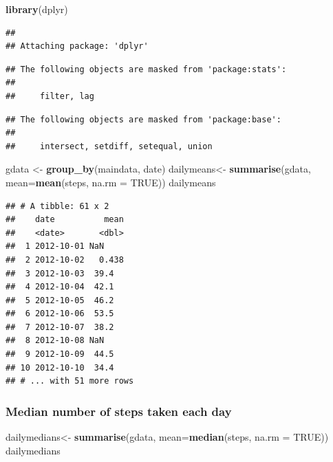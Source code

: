 \documentclass[]{article}
\newenvironment{Shaded}{\begin{snugshade}}{\end{snugshade}}
\newcommand{\KeywordTok}[1]{\textcolor[rgb]{0.13,0.29,0.53}{\textbf{#1}}}
\newcommand{\DataTypeTok}[1]{\textcolor[rgb]{0.13,0.29,0.53}{#1}}
\newcommand{\StringTok}[1]{\textcolor[rgb]{0.31,0.60,0.02}{#1}}
\newcommand{\OtherTok}[1]{\textcolor[rgb]{0.56,0.35,0.01}{#1}}
\newcommand{\NormalTok}[1]{#1}
\begin{document}
\begin{Shaded}
\begin{Highlighting}[]
\KeywordTok{library}\NormalTok{(dplyr)}
\end{Highlighting}
\end{Shaded}

\begin{verbatim}
## 
## Attaching package: 'dplyr'
\end{verbatim}

\begin{verbatim}
## The following objects are masked from 'package:stats':
## 
##     filter, lag
\end{verbatim}

\begin{verbatim}
## The following objects are masked from 'package:base':
## 
##     intersect, setdiff, setequal, union
\end{verbatim}

\begin{Shaded}
\begin{Highlighting}[]
\NormalTok{gdata <-}\StringTok{ }\KeywordTok{group_by}\NormalTok{(maindata, date)}
\NormalTok{dailymeans<-}\StringTok{ }\KeywordTok{summarise}\NormalTok{(gdata, }\DataTypeTok{mean=}\KeywordTok{mean}\NormalTok{(steps, }\DataTypeTok{na.rm =} \OtherTok{TRUE}\NormalTok{))}
\NormalTok{dailymeans}
\end{Highlighting}
\end{Shaded}

\begin{verbatim}
## # A tibble: 61 x 2
##    date          mean
##    <date>       <dbl>
##  1 2012-10-01 NaN    
##  2 2012-10-02   0.438
##  3 2012-10-03  39.4  
##  4 2012-10-04  42.1  
##  5 2012-10-05  46.2  
##  6 2012-10-06  53.5  
##  7 2012-10-07  38.2  
##  8 2012-10-08 NaN    
##  9 2012-10-09  44.5  
## 10 2012-10-10  34.4  
## # ... with 51 more rows
\end{verbatim}

\subsubsection{Median number of steps taken each
day}\label{median-number-of-steps-taken-each-day}

\begin{Shaded}
\begin{Highlighting}[]
\NormalTok{dailymedians<-}\StringTok{ }\KeywordTok{summarise}\NormalTok{(gdata, }\DataTypeTok{mean=}\KeywordTok{median}\NormalTok{(steps, }\DataTypeTok{na.rm =} \OtherTok{TRUE}\NormalTok{))}
\NormalTok{dailymedians}
\end{Highlighting}
\end{Shaded}
\end{document}
